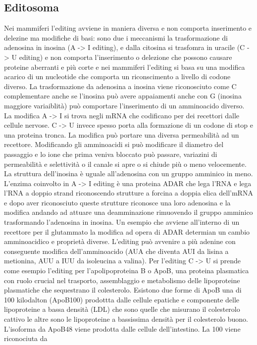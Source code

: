 \subsection{Editosoma}
Nei mammiferi l'editing avviene in maniera diversa e non comporta inserimento e delezine ma modifiche di basi: sono due i meccanismi la trasformazione di adenosina in inosina (A -> I
editing), e dalla citosina si trasfomra in uracile (C -> U editing) e non comporta l'inserimento o delezione che possono causare proteine aberranti e pi\`u corte e nei mammiferi 
l'editing si basa su una modifica  acarico di un nucleotide che comporta un riconscimento a livello di codone diverso. La trasformazione da adenosina a inosina viene riconosciuto come
C complementare anche se l'inosina pu\`o avere appaiamenti anche con G (inosina maggiore variaiblit\`a) pu\`o comportare l'inserimento di un amminoacido diverso. La modifica A -> I si
trova negli mRNA che codificano per dei recettori dalle cellule nervose. C -> U invece spesso porta alla formazione di un codone di stop e una proteina tronca. La modifica pu\`o 
portare una diversa permeabilit\`a ad un recettore. Modificando gli amminoacidi si pu\`o modificare il diametro del passaggio e lo ione che prima veniva bloccato pu\`o passare, variazini
di permeabilit\`a e selettivit\`a o il canale si apre o si chiude pi\`u o meno velocemente. La struttura dell'inosina \`e uguale all'adenosina con un gruppo amminico in meno. L'enzima
coinvolto in A -> I editing \`e una proteina ADAR che lega l'RNA e lega l'RNA a doppio strand riconoscendo strutture a forcina a doppia elica dell'mRNA e dopo aver riconosciuto 
queste strutture riconosce una loro adenosina e la modifica andando ad attuare una deamminazione rimuovendo il gruppo amminico trasformando l'adenosina in inosina. Un esempio che avviene
all'interno di un recettore per il glutammato la modifica ad opera di ADAR determian un cambio amminoacidico e propriet\`a diverse. L'editing pu\`o avvenire a pi\`u adenine con 
conseguente modifica dell'amminoacido (AUA che diventa AUI da lisina a metionina, AUU a IUU da isoleucina a valina). Per l'editing C -> U si prende come esempio l'editing per 
l'apolipoproteina B o ApoB, una proteina plasmatica con ruolo crucial nel trasporto, assemblaggio e metabolismo delle lipoproteine plasmatiche che sequestrano il colesterolo. Esistono
due forme di ApoB una di 100 kilodalton (ApoB100) prodottta dalle cellule epatiche e componente delle lipoproteine a bassa densit\`a (LDL) che sono quelle che misurano il colesterolo 
cattivo le altre sono le lipoproteine a bassissima densit\`a per il colesterolo buono. L'isoforma da ApoB48 viene prodotta dalle cellule dell'intestino. La 100 viene riconociuta da
